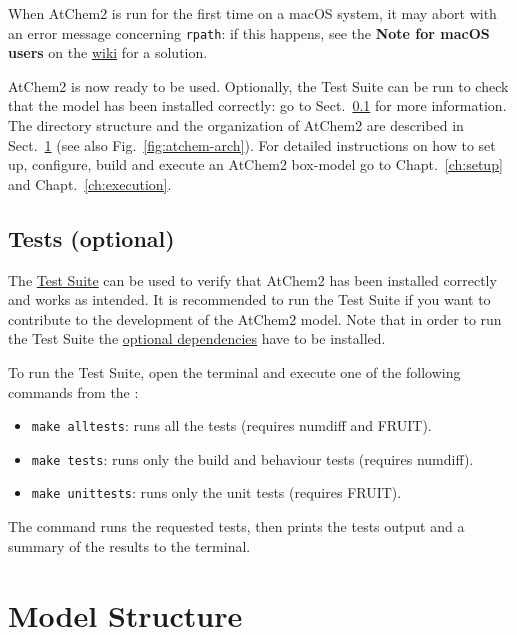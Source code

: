 When AtChem2 is run for the first time on a macOS system, it may abort
with an error message concerning \texttt{rpath}: if this happens, see
the \textbf{Note for macOS users} on the
\href{https://github.com/AtChem/AtChem2/wiki/How-to-install-AtChem2}{wiki}
for a solution.

AtChem2 is now ready to be used. Optionally, the Test Suite can be run
to check that the model has been installed correctly: go to
Sect.~\ref{subsec:tests-optional} for more information. The directory
structure and the organization of AtChem2 are described in
Sect.~\ref{sec:model-structure} (see also Fig.~\ref{fig:atchem-arch}).
For detailed instructions on how to set up, configure, build and
execute an AtChem2 box-model go to Chapt.~\ref{ch:setup} and
Chapt.~\ref{ch:execution}.

\subsection{Tests (optional)} \label{subsec:tests-optional}

The \hyperref[sec:test-suite]{Test Suite} can be used to verify that
AtChem2 has been installed correctly and works as intended. It is
recommended to run the Test Suite if you want to contribute to the
development of the AtChem2 model. Note that in order to run the Test
Suite the \hyperref[subsec:optional-dependencies]{optional dependencies}
have to be installed.

To run the Test Suite, open the terminal and execute one of the
following commands from the \maindir:

\begin{itemize}
\item \verb|make alltests|: runs all the tests (requires numdiff and
  FRUIT).
\item \verb|make tests|: runs only the build and behaviour tests
  (requires numdiff).
\item \verb|make unittests|: runs only the unit tests (requires
  FRUIT).
\end{itemize}

The command runs the requested tests, then prints the tests output and
a summary of the results to the terminal.

\section{Model Structure} \label{sec:model-structure}

